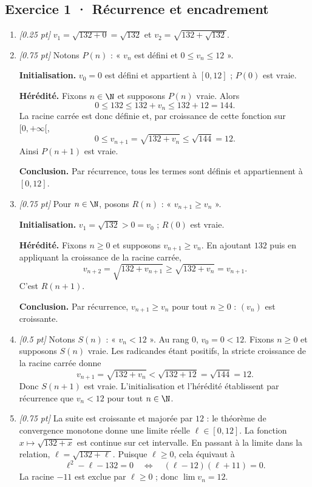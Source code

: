 \subsection*{Exercice 1 · Récurrence et encadrement}\begin{enumerate}

\item \textit{[\num{0,25} pt]} $v_1=\sqrt{132+0}=\sqrt{132}$ et $v_2=\sqrt{132+\sqrt{132}}$.

\item \textit{[\num{0,75} pt]} Notons $P(n)$ : « $v_n$ est défini et $0\le v_n\le 12$ ».
\par\smallskip\textbf{Initialisation.} $v_0=0$ est défini et appartient à $[0,12]$ ; $P(0)$ est vraie.
\par\smallskip\textbf{Hérédité.} Fixons $n\in\N$ et supposons $P(n)$ vraie. Alors
\[0\le 132\le 132+v_n\le 132+12=144.\]
La racine carrée est donc définie et, par croissance de cette fonction sur $[0,+\infty[$,
\[0\le v_{n+1}=\sqrt{132+v_n}\le\sqrt{144}=12.\]
Ainsi $P(n+1)$ est vraie.
\par\smallskip\textbf{Conclusion.} Par récurrence, tous les termes sont définis et appartiennent à $[0,12]$.

\item \textit{[\num{0,75} pt]} Pour $n\in\N$, posons $R(n)$ : « $v_{n+1}\ge v_n$ ».
\par\smallskip\textbf{Initialisation.} $v_1=\sqrt{132}>0=v_0$ ; $R(0)$ est vraie.
\par\smallskip\textbf{Hérédité.} Fixons $n\ge0$ et supposons $v_{n+1}\ge v_n$. En ajoutant $132$ puis en appliquant la croissance de la racine carrée,
\[v_{n+2}=\sqrt{132+v_{n+1}}\ge\sqrt{132+v_n}=v_{n+1}.\]
C'est $R(n+1)$.
\par\smallskip\textbf{Conclusion.} Par récurrence, $v_{n+1}\ge v_n$ pour tout $n\ge0$ : $(v_n)$ est croissante.

\item \textit{[\num{0,5} pt]} Notons $S(n)$ : « $v_n<12$ ». Au rang $0$, $v_0=0<12$.
Fixons $n\ge0$ et supposons $S(n)$ vraie. Les radicandes étant positifs, la stricte croissance de la racine carrée donne
\[v_{n+1}=\sqrt{132+v_n}<\sqrt{132+12}=\sqrt{144}=12.\]
Donc $S(n+1)$ est vraie. L'initialisation et l'hérédité établissent par récurrence que $v_n<12$ pour tout $n\in\N$.

\item \textit{[\num{0,75} pt]} La suite est croissante et majorée par $12$ : le théorème de convergence monotone donne une limite réelle $\ell\in[0,12]$.
La fonction $x\mapsto\sqrt{132+x}$ est continue sur cet intervalle. En passant à la limite dans la relation, $\ell=\sqrt{132+\ell}$. Puisque $\ell\ge0$, cela équivaut à
\[\ell^2-\ell-132=0\quad\Longleftrightarrow\quad(\ell-12)(\ell+11)=0.\]
La racine $-11$ est exclue par $\ell\ge0$ ; donc $\lim v_n=12$.


\end{enumerate}

